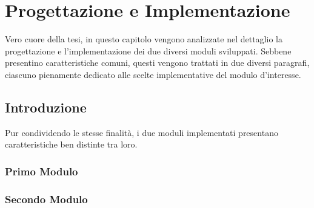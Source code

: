 \chapter{Progettazione e Implementazione} %
%

\begin{citazione}
Vero cuore della tesi, in questo capitolo vengono analizzate nel dettaglio la progettazione e l'implementazione dei due diversi moduli sviluppati. Sebbene presentino caratteristiche comuni, questi vengono trattati in due diversi paragrafi, ciascuno pienamente dedicato alle scelte implementative del modulo d'interesse.
\end{citazione}

\section{Introduzione}
Pur condividendo le stesse finalità, i due moduli implementati presentano caratteristiche ben distinte tra loro. 

\subsection{Primo Modulo}

\subsection{Secondo Modulo}
    
\newpage
